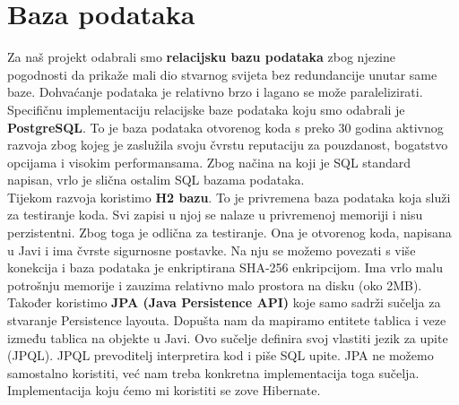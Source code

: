 		\section{Baza podataka}
			
		Za naš projekt odabrali smo \textbf{relacijsku bazu podataka} zbog njezine pogodnosti da prikaže mali dio stvarnog svijeta bez redundancije unutar same baze. Dohvaćanje podataka je relativno brzo i lagano se može paralelizirati. Specifičnu implementaciju relacijske baze podataka koju smo odabrali je \textbf{PostgreSQL}. To je baza podataka otvorenog koda s preko 30 godina aktivnog razvoja zbog kojeg je zaslužila svoju čvrstu reputaciju za pouzdanost, bogatstvo opcijama i visokim performansama. Zbog načina na koji je SQL standard napisan, vrlo je slična ostalim SQL bazama podataka.\\ 
		
		Tijekom razvoja koristimo \textbf{H2 bazu}. To je privremena baza podataka koja služi za testiranje koda. Svi zapisi u njoj se nalaze u privremenoj memoriji i nisu perzistentni. Zbog toga je odlična za testiranje. Ona je otvorenog koda, napisana u Javi i ima čvrste sigurnosne postavke. Na nju se možemo povezati s više konekcija i baza podataka je enkriptirana SHA-256 enkripcijom. Ima vrlo malu potrošnju memorije i zauzima relativno malo prostora na disku (oko 2MB). \\ 
		
		Također koristimo \textbf{JPA (Java Persistence API)} koje samo sadrži sučelja za stvaranje Persistence layouta. Dopušta nam da mapiramo entitete tablica i veze između tablica na objekte u Javi. Ovo sučelje definira svoj vlastiti jezik za upite (JPQL). JPQL prevoditelj interpretira kod i piše SQL upite. JPA ne možemo samostalno koristiti, već nam treba konkretna implementacija toga sučelja. Implementacija koju ćemo mi koristiti se zove Hibernate. \\ 
		
